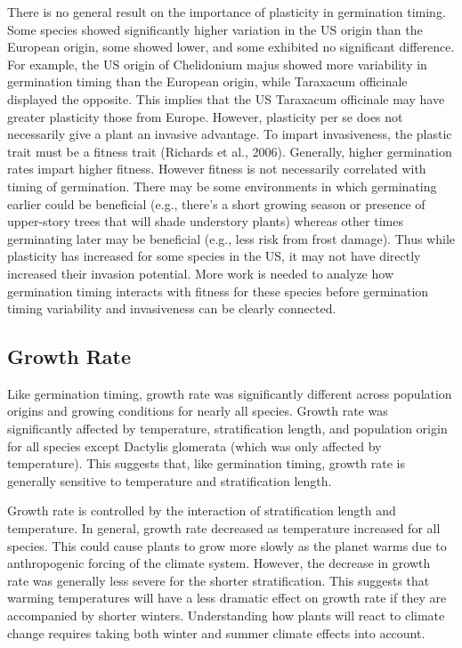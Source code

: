 \documentclass[12pt]{article}\usepackage[]{graphicx}\usepackage[]{color}
\begin{document}
	There is no general result on the importance of plasticity in germination timing. Some species showed significantly higher variation in the US origin than the European origin, some showed lower, and some exhibited no significant difference. For example, the US origin of Chelidonium majus showed more variability in germination timing than the European origin, while Taraxacum officinale displayed the opposite. This implies that the US Taraxacum officinale may have greater plasticity those from Europe.  However, plasticity per se does not necessarily give a plant an invasive advantage. To impart invasiveness, the plastic trait must be a fitness trait (Richards et al., 2006). Generally, higher germination rates impart higher fitness. However fitness is not necessarily correlated with timing of germination. There may be some environments in which germinating earlier could be beneficial (e.g., there’s a short growing season or presence of upper-story trees that will shade understory plants) whereas other times germinating later may be beneficial (e.g., less risk from frost damage). Thus while plasticity has increased for some species in the US, it may not have directly increased their invasion potential. More work is needed to analyze how germination timing interacts with fitness for these species before germination timing variability and invasiveness can be clearly connected.  
	
	\subsection{Growth Rate}
	
	Like germination timing, growth rate was significantly different across population origins and growing conditions for nearly all species. Growth rate was significantly affected by temperature, stratification length, and population origin for all species except Dactylis glomerata (which was only affected by temperature). This suggests that, like germination timing, growth rate is generally sensitive to temperature and stratification length. 
	
	Growth rate is controlled by the interaction of stratification length and temperature. In general, growth rate decreased as temperature increased for all species. This could cause plants to grow more slowly as the planet warms due to anthropogenic forcing of the climate system. However, the decrease in growth rate was generally less severe for the shorter stratification. This suggests that warming temperatures will have a less dramatic effect on growth rate if they are accompanied by shorter winters. Understanding how plants will react to climate change requires taking both winter and summer climate effects into account. 
	
\end{document}
